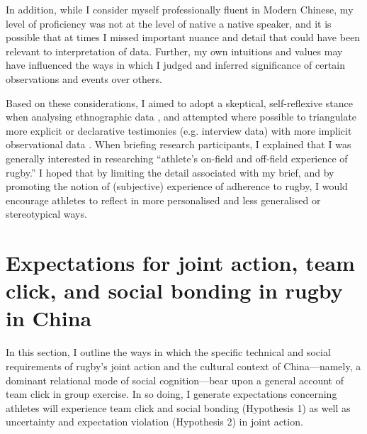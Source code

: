 \begin{CJK}{UTF8}{gbsn}
In addition, while I consider myself professionally fluent in Modern Chinese, my level of proficiency was not at the level of native a native speaker, and it is possible that at times I missed important nuance and detail that could have been relevant to interpretation of data. Further, my own intuitions and values may have influenced the ways in which I judged and inferred significance of certain observations and  events over others.

Based on these considerations, I aimed to adopt a skeptical, self-reflexive stance when analysing ethnographic data \citep{Lichterman2017}, and attempted where possible to triangulate more explicit or declarative testimonies (e.g. interview data) with more implicit observational data \citep[see, for example:][]{Duffy1987}.
When briefing research participants, I explained that I was generally interested in researching ``athlete's on-field and off-field experience of rugby.'' I hoped that by limiting the detail associated with my brief, and by promoting the notion of (subjective) experience of adherence to rugby, I would encourage athletes to reflect in more personalised and less generalised or stereotypical ways.











\section{Expectations for joint action, team click, and social bonding in rugby in China}

In this section, I outline the ways in which the specific technical and social requirements of rugby's joint action and the cultural context of China---namely, a dominant relational mode of social cognition---bear upon a general account of team click in group exercise.  In so doing, I generate expectations concerning athletes will experience team click and social bonding (Hypothesis 1) as well as uncertainty and expectation violation (Hypothesis 2) in joint action.


\end{CJK}
